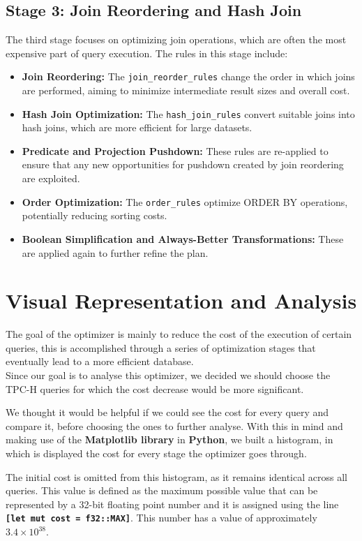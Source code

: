 \documentclass[a4paper,12pt]{scrreprt}
\begin{document}
\section{Stage 3: Join Reordering and Hash Join}
The third stage focuses on optimizing join operations, which are often the most expensive part of query execution. The rules in this stage include:
\begin{itemize}
    \item \textbf{Join Reordering:} The \texttt{join\_reorder\_rules} change the order in which joins are performed, aiming to minimize intermediate result sizes and overall cost.
    \item \textbf{Hash Join Optimization:} The \texttt{hash\_join\_rules} convert suitable joins into hash joins, which are more efficient for large datasets.
    \item \textbf{Predicate and Projection Pushdown:} These rules are re-applied to ensure that any new opportunities for pushdown created by join reordering are exploited.
    \item \textbf{Order Optimization:} The \texttt{order\_rules} optimize ORDER BY operations, potentially reducing sorting costs.
    \item \textbf{Boolean Simplification and Always-Better Transformations:} These are applied again to further refine the plan.
\end{itemize}




\chapter{Visual Representation and Analysis} \label{chap:concDesenho}
\thispagestyle{fancy}
The goal of the optimizer is mainly to reduce the cost of the execution of certain queries, this is accomplished through a series of optimization stages that eventually lead to a more efficient database. \\
Since our goal is to analyse this optimizer, we decided we should choose the TPC-H queries for which the cost decrease would be more significant.

We thought it would be helpful if we could see the cost for every query and compare it, before choosing the ones to further analyse. With this in mind and making use of the \textbf{Matplotlib library} in \textbf{Python}, we built a histogram, in which is displayed the cost for every stage the optimizer goes through.

The initial cost is omitted from this histogram, as it remains identical across all queries.
This value is defined as the maximum possible value that can be represented by a 32-bit floating point number and it is assigned using the line \textbf{\texttt{[let mut cost = f32::MAX]}}. This number has a value of approximately $3.4 \times 10^{38}$.
\end{document}
